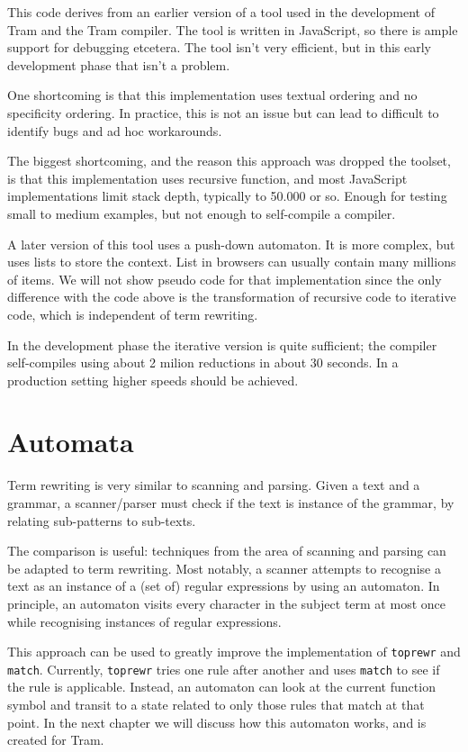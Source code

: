 \documentclass[11pt,twoside]{memoir}
\def\T{\texttt}
\begin{document}
This code derives from an earlier version of a tool used in the development of Tram and the Tram compiler. The tool is written in JavaScript, so there is ample support for debugging etcetera. The tool isn't very efficient, but in this early development phase that isn't a problem.

One shortcoming is that this implementation uses textual ordering and no specificity ordering. In practice, this is not an issue but can lead to difficult to identify bugs and ad hoc workarounds.

The biggest shortcoming, and the reason this approach was dropped the toolset, is that this implementation uses recursive function, and most JavaScript implementations limit stack depth, typically to 50.000 or so. Enough for testing small to medium examples, but not enough to self-compile a compiler.

A later version of this tool uses a push-down automaton. It is more complex, but uses lists to store the context. List in browsers can usually contain many millions of items. We will not show pseudo code for that implementation since the only difference with the code above is the transformation of recursive code to iterative code, which is independent of term rewriting. 

In the development phase the iterative version is quite sufficient; the compiler self-compiles using about 2 milion reductions in about 30 seconds. In a production setting higher speeds should be achieved.

\section{Automata}
Term rewriting is very similar to scanning and parsing. Given a text and a grammar, a scanner/parser must check if the text is instance of the grammar, by relating sub-patterns to sub-texts.

The comparison is useful: techniques from the area of scanning and parsing can be adapted to term rewriting. Most notably, a scanner attempts to recognise a text as an instance of a (set of) regular expressions by using an automaton. In principle, an automaton visits every character in the subject term at most once while recognising instances of regular expressions. 

This approach can be used to greatly improve the implementation of \T{toprewr} and \T{match}. Currently, \T{toprewr} tries one rule after another and uses \T{match} to see if the rule is applicable. Instead, an automaton can look at the current function symbol and transit to a state related to only those rules that match at that point. In the next chapter we will discuss how this automaton works, and is created for Tram.
\end{document}
